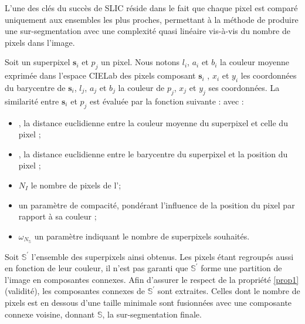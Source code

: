 L'une des clés du succès de SLIC réside dans le fait que chaque pixel est comparé uniquement aux ensembles les plus proches, permettant à la méthode de produire une sur-segmentation avec une complexité quasi linéaire vis-à-vis du nombre de pixels dans l'image. 

Soit un superpixel $\mathbf{s}_{i}$ et $p_{j}$ un pixel. Nous notons $l_{i}$, $a_{i}$ et $b_{i}$ la couleur moyenne exprimée dans l'espace CIELab des pixels composant $\mathbf{s}_{i}$ ,  $x_{i}$ et $y_{i}$ les coordonnées du barycentre de $\mathbf{s}_{i}$, $l_{j}$, $a_{j}$ et $b_{j}$  la couleur de $p_{j}$, $x_{j}$ et $y_{j}$ ses coordonnées.  La similarité entre $\mathbf{s}_{i}$ et $p_{j}$ est évaluée par la fonction suivante :
avec :
\begin{itemize}
\item {}, la distance euclidienne entre la couleur moyenne du superpixel et celle du pixel ;
\item  {}, la distance euclidienne entre le barycentre du superpixel et la position du pixel ;
\item $N_{I}$ le nombre de pixels de l';
\item {} un paramètre de compacité, pondérant l'influence de la position du pixel par rapport à sa couleur ;
\item $\omega_{N_{\mathbb{S}}}$ un paramètre indiquant le nombre de superpixels souhaités.
\end{itemize}

Soit $\mathbb{S}^{'}$ l'ensemble des superpixels ainsi obtenus. Les pixels étant regroupés aussi en fonction de leur couleur, il n'est pas garanti que  $\mathbb{S}^{'}$ forme une  partition de l'image en composantes connexes. Afin d'assurer le respect de la propriété \ref{prop1} (validité), les composantes connexes de $\mathbb{S}^{'}$  sont extraites. Celles dont le nombre de pixels est en dessous d'une taille minimale sont fusionnées avec une composante connexe voisine, donnant $\mathbb{S}$, la sur-segmentation finale.

